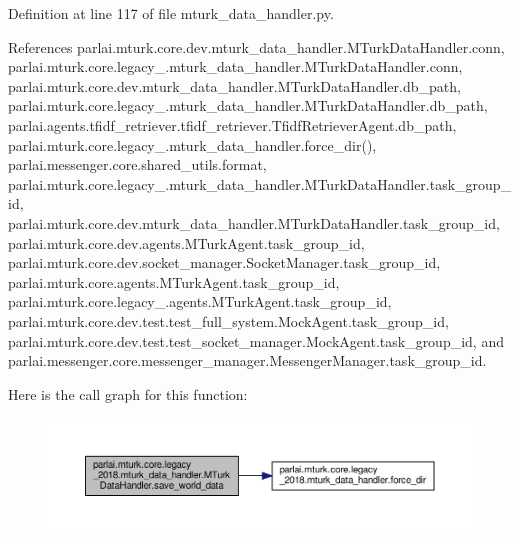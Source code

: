 Definition at line 117 of file mturk\+\_\+data\+\_\+handler.\+py.



References parlai.\+mturk.\+core.\+dev.\+mturk\+\_\+data\+\_\+handler.\+M\+Turk\+Data\+Handler.\+conn, parlai.\+mturk.\+core.\+legacy\+\_.\+mturk\+\_\+data\+\_\+handler.\+M\+Turk\+Data\+Handler.\+conn, parlai.\+mturk.\+core.\+dev.\+mturk\+\_\+data\+\_\+handler.\+M\+Turk\+Data\+Handler.\+db\+\_\+path, parlai.\+mturk.\+core.\+legacy\+\_.\+mturk\+\_\+data\+\_\+handler.\+M\+Turk\+Data\+Handler.\+db\+\_\+path, parlai.\+agents.\+tfidf\+\_\+retriever.\+tfidf\+\_\+retriever.\+Tfidf\+Retriever\+Agent.\+db\+\_\+path, parlai.\+mturk.\+core.\+legacy\+\_.\+mturk\+\_\+data\+\_\+handler.\+force\+\_\+dir(), parlai.\+messenger.\+core.\+shared\+\_\+utils.\+format, parlai.\+mturk.\+core.\+legacy\+\_.\+mturk\+\_\+data\+\_\+handler.\+M\+Turk\+Data\+Handler.\+task\+\_\+group\+\_\+id, parlai.\+mturk.\+core.\+dev.\+mturk\+\_\+data\+\_\+handler.\+M\+Turk\+Data\+Handler.\+task\+\_\+group\+\_\+id, parlai.\+mturk.\+core.\+dev.\+agents.\+M\+Turk\+Agent.\+task\+\_\+group\+\_\+id, parlai.\+mturk.\+core.\+dev.\+socket\+\_\+manager.\+Socket\+Manager.\+task\+\_\+group\+\_\+id, parlai.\+mturk.\+core.\+agents.\+M\+Turk\+Agent.\+task\+\_\+group\+\_\+id, parlai.\+mturk.\+core.\+legacy\+\_.\+agents.\+M\+Turk\+Agent.\+task\+\_\+group\+\_\+id, parlai.\+mturk.\+core.\+dev.\+test.\+test\+\_\+full\+\_\+system.\+Mock\+Agent.\+task\+\_\+group\+\_\+id, parlai.\+mturk.\+core.\+dev.\+test.\+test\+\_\+socket\+\_\+manager.\+Mock\+Agent.\+task\+\_\+group\+\_\+id, and parlai.\+messenger.\+core.\+messenger\+\_\+manager.\+Messenger\+Manager.\+task\+\_\+group\+\_\+id.

Here is the call graph for this function\+:
\nopagebreak
\begin{figure}[H]
\begin{center}
\leavevmode
\includegraphics[width=350pt]{classparlai_1_1mturk_1_1core_1_1legacy__2018_1_1mturk__data__handler_1_1MTurkDataHandler_a823e69b5a768d557ec581c376751681d_cgraph}
\end{center}
\end{figure}


